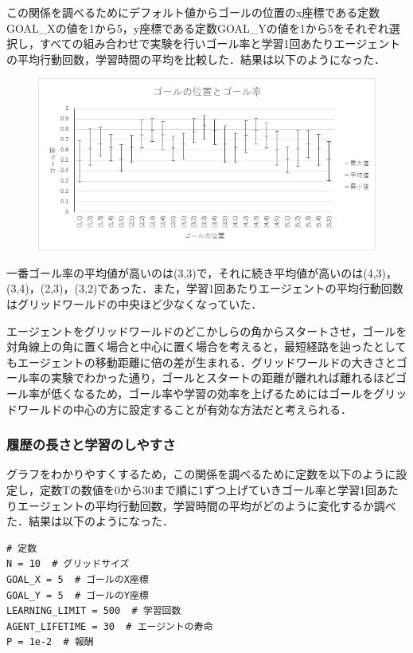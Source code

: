 \documentclass[a4j,11pt]{jarticle}
\begin{document}
この関係を調べるためにデフォルト値からゴールの位置のx座標である定数GOAL\_Xの値を1から5，y座標である定数GOAL\_Yの値を1から5をそれぞれ選択し，すべての組み合わせで実験を行いゴール率と学習1回あたりエージェントの平均行動回数，学習時間の平均を比較した．結果は以下のようになった．

\begin{figure}[ht]
  \begin{center}
    \includegraphics[scale=1.5]{img/changeGoal.png}
  \end{center}
\end{figure}

一番ゴール率の平均値が高いのは(3,3)で，それに続き平均値が高いのは(4,3)，(3,4)，(2,3)，(3,2)であった．また，学習1回あたりエージェントの平均行動回数はグリッドワールドの中央ほど少なくなっていた．

エージェントをグリッドワールドのどこかしらの角からスタートさせ，ゴールを対角線上の角に置く場合と中心に置く場合を考えると，最短経路を辿ったとしてもエージェントの移動距離に倍の差が生まれる．グリッドワールドの大きさとゴール率の実験でわかった通り，ゴールとスタートの距離が離れれば離れるほどゴール率が低くなるため，ゴール率や学習の効率を上げるためにはゴールをグリッドワールドの中心の方に設定することが有効な方法だと考えられる．

\newpage

\subsubsection{履歴の長さと学習のしやすさ}

グラフをわかりやすくするため，この関係を調べるために定数を以下のように設定し，定数Tの数値を0から30まで順に1ずつ上げていきゴール率と学習1回あたりエージェントの平均行動回数，学習時間の平均がどのように変化するか調べた．結果は以下のようになった．

\begin{verbatim}
# 定数
N = 10  # グリッドサイズ
GOAL_X = 5  # ゴールのX座標
GOAL_Y = 5  # ゴールのY座標
LEARNING_LIMIT = 500  # 学習回数
AGENT_LIFETIME = 30  # エージントの寿命
P = 1e-2  # 報酬
\end{verbatim}
\end{document}
